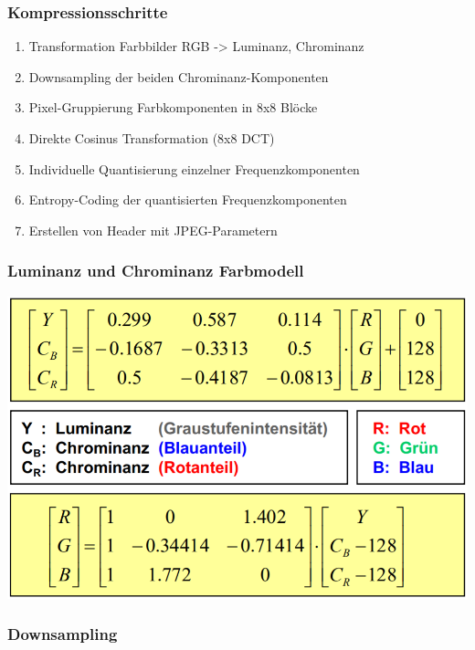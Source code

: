 \subsubsection{Kompressionsschritte}%

\begin{enumerate}
    \item Transformation Farbbilder RGB -> Luminanz, Chrominanz
    \item Downsampling der beiden Chrominanz-Komponenten
    \item Pixel-Gruppierung Farbkomponenten in 8x8 Blöcke
    \item Direkte Cosinus Transformation (8x8 DCT)
    \item Individuelle Quantisierung einzelner Frequenzkomponenten
    \item Entropy-Coding der quantisierten Frequenzkomponenten
    \item Erstellen von Header mit JPEG-Parametern
\end{enumerate}

\subsubsection{Luminanz und Chrominanz Farbmodell}

\begin{center}
    \includegraphics[width=1\linewidth]{images/lumchrom.png}
\end{center}

\subsubsection{Downsampling}

